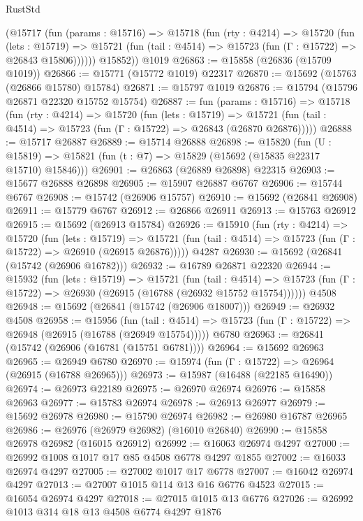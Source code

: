 \begin{lexlean}{RustStd}
\begin{coremodule}
        (@15717
          (fun (params : @15716) =>
          @15718
            (fun (rty : @4214) =>
            @15720
              (fun (lets : @15719) =>
              @15721 (fun (tail : @4514) => @15723 (fun (Γ : @15722) => @26843 @15806))))))
        @15852))
    @1019
@26863 := @15858 (@26836 (@15709 @1019))
@26866 := @15771 (@15772 @1019) @22317
@26870 := @15692 (@15763 (@26866 @15780) @15784)
@26871 := @15797 @1019
@26876 := @15794 (@15796 @26871 @22320 @15752 @15754)
@26887 := fun (params : @15716) =>
  @15718
    (fun (rty : @4214) =>
    @15720
      (fun (lets : @15719) =>
      @15721 (fun (tail : @4514) => @15723 (fun (Γ : @15722) => @26843 (@26870 @26876)))))
@26888 := @15717 @26887
@26889 := @15714 @26888
@26898 := @15820
    (fun (U : @15819) => @15821 (fun (t : @7) => @15829 (@15692 (@15835 @22317 @15710) @15846)))
@26901 := @26863 (@26889 @26898) @22315
@26903 := @15677 @26888 @26898
@26905 := @15907 @26887 @6767
@26906 := @15744 @6767
@26908 := @15742 (@26906 @15757)
@26910 := @15692 (@26841 @26908)
@26911 := @15779 @6767
@26912 := @26866 @26911
@26913 := @15763 @26912
@26915 := @15692 (@26913 @15784)
@26926 := @15910
    (fun (rty : @4214) =>
    @15720
      (fun (lets : @15719) =>
      @15721 (fun (tail : @4514) => @15723 (fun (Γ : @15722) => @26910 (@26915 @26876)))))
    @4287
@26930 := @15692 (@26841 (@15742 (@26906 @16782)))
@26932 := @16789 @26871 @22320
@26944 := @15932
    (fun (lets : @15719) =>
    @15721
      (fun (tail : @4514) =>
      @15723 (fun (Γ : @15722) => @26930 (@26915 (@16788 (@26932 @15752 @15754))))))
    @4508
@26948 := @15692 (@26841 (@15742 (@26906 @18007)))
@26949 := @26932 @4508
@26958 := @15956
    (fun (tail : @4514) => @15723 (fun (Γ : @15722) => @26948 (@26915 (@16788 (@26949 @15754)))))
    @6780
@26963 := @26841 (@15742 (@26906 (@16781 (@15751 @6781))))
@26964 := @15692 @26963
@26965 := @26949 @6780
@26970 := @15974 (fun (Γ : @15722) => @26964 (@26915 (@16788 @26965)))
@26973 := @15987 (@16488 (@22185 @16490))
@26974 := @26973 @22189
@26975 := @26970 @26974
@26976 := @15858 @26963
@26977 := @15783 @26974
@26978 := @26913 @26977
@26979 := @15692 @26978
@26980 := @15790 @26974
@26982 := @26980 @16787 @26965
@26986 := @26976 (@26979 @26982) (@16010 @26840)
@26990 := @15858 @26978 @26982 (@16015 @26912)
@26992 := @16063 @26974 @4297
@27000 := @26992 @1008 @1017 @17 @85 @4508 @6778 @4297 @1855
@27002 := @16033 @26974 @4297
@27005 := @27002 @1017 @17 @6778
@27007 := @16042 @26974 @4297
@27013 := @27007 @1015 @114 @13 @16 @6776 @4523
@27015 := @16054 @26974 @4297
@27018 := @27015 @1015 @13 @6776
@27026 := @26992 @1013 @314 @18 @13 @4508 @6774 @4297 @1876

\end{coremodule}
\end{lexlean}
